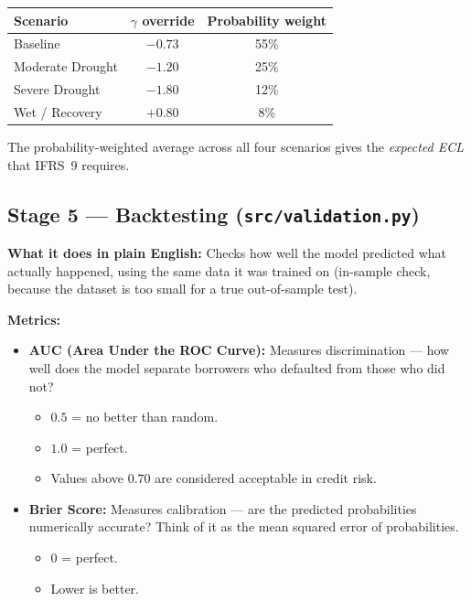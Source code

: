 \documentclass[12pt,a4paper]{article}
\begin{document}
\begin{center}
\begin{tabular}{lcc}
  \toprule
  Scenario & $\gamma$ override & Probability weight \\
  \midrule
  Baseline         & $-0.73$ & 55\% \\
  Moderate Drought & $-1.20$ & 25\% \\
  Severe Drought   & $-1.80$ & 12\% \\
  Wet / Recovery   & $+0.80$ &  8\% \\
  \bottomrule
\end{tabular}
\end{center}

The probability-weighted average across all four scenarios gives the
\emph{expected ECL} that IFRS~9 requires.

\subsection{Stage 5 --- Backtesting (\texttt{src/validation.py})}

\textbf{What it does in plain English:}
Checks how well the model predicted what actually happened, using the same
data it was trained on (in-sample check, because the dataset is too small for
a true out-of-sample test).

\textbf{Metrics:}
\begin{itemize}[leftmargin=1.5em]
  \item \textbf{AUC (Area Under the ROC Curve):}
        Measures discrimination --- how well does the model separate borrowers
        who defaulted from those who did not?
        \begin{itemize}
          \item $0.5$ = no better than random.
          \item $1.0$ = perfect.
          \item Values above $0.70$ are considered acceptable in credit risk.
        \end{itemize}
  \item \textbf{Brier Score:}
        Measures calibration --- are the predicted probabilities numerically
        accurate?  Think of it as the mean squared error of probabilities.
        \begin{itemize}
          \item $0$ = perfect.
          \item Lower is better.
        \end{itemize}
\end{itemize}
\end{document}
